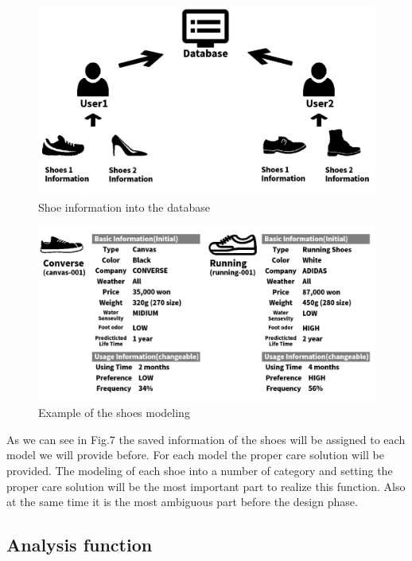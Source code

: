 \documentclass[conference]{IEEEtran}
\begin{document}
\begin{figure}[h]
\begin{center}
    \includegraphics[scale=0.28]{management1}
    \caption{Shoe information into the database} \label{fig:label}
\end{center}
\end{figure}
\begin{figure}[h]
\begin{center}
    \includegraphics[scale=0.24]{management2}
    \caption{Example of the shoes modeling } \label{fig:label}
\end{center}
\end{figure}

As we can see in Fig.7 the saved information of the shoes will be assigned to each model we will provide before. For each model the proper care solution will be provided. 
The modeling of each shoe into a number of category and setting the proper care solution will be the most important part to realize this function. Also at the same time it is the most ambiguous part before the design phase.



\subsection{Analysis function}
\end{document}
